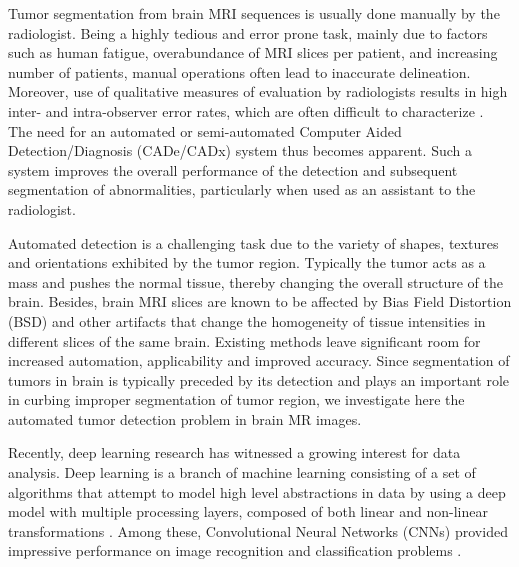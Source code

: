 \documentclass[journal,twocolumn]{IEEEtran}
\begin{document}
Tumor segmentation from brain MRI sequences is usually done manually by the radiologist. Being a highly tedious and error prone task, mainly due to factors such as human fatigue, overabundance of MRI slices per patient, and increasing number of patients, manual operations often lead to inaccurate delineation. Moreover, use of qualitative measures of evaluation by radiologists results in  high inter- and intra-observer error rates, which are often difficult to characterize \citep{Bauer2013,banerjee2016single,banerjee2017roi,Pereira2016}. The need for an automated or semi-automated Computer Aided Detection/Diagnosis (CADe/CADx) system thus becomes apparent. Such a system improves the overall performance of the detection and subsequent segmentation of abnormalities, particularly when used as an assistant to the radiologist.

Automated detection is a challenging task due to the variety of shapes, textures and orientations exhibited by the tumor region. Typically the  tumor acts as a mass and pushes the normal tissue, thereby changing the overall structure of the brain. Besides, brain MRI slices are known to be affected by Bias Field Distortion (BSD) and other artifacts that change the homogeneity of tissue intensities in different slices of the same brain. Existing methods leave significant room for increased automation, applicability and improved accuracy. Since segmentation of tumors in brain is typically preceded by its detection and plays an important role in curbing improper segmentation of tumor region, we investigate here the automated tumor detection problem in brain MR images.

Recently, deep learning research has witnessed a growing interest for data analysis. Deep learning is a branch of machine learning consisting of a set of algorithms that attempt to model high level abstractions in data by using a deep model with multiple processing layers, composed of both linear and non-linear transformations \cite{LeCun2015,Bengio2016_book,Lecun1998}. Among these,  Convolutional Neural Networks (CNNs) provided  impressive performance on image recognition and classification problems \cite{Krizhevsky2012, Farabet2013, Zhang2014_overfeat, Simonyan2014_verydeepcnn}.
\end{document}
